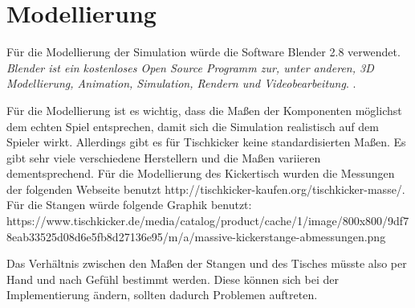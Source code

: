 \section{Modellierung}

Für die Modellierung der Simulation würde die Software Blender 2.8 verwendet. \textit{Blender ist ein kostenloses Open Source Programm zur, unter anderen, 3D Modellierung, Animation, Simulation, Rendern und Videobearbeitung}. \citep{Blender}.\\


Für die Modellierung ist es wichtig, dass die Maßen der Komponenten möglichst dem echten Spiel entsprechen, damit sich die Simulation realistisch auf dem Spieler wirkt. Allerdings gibt es für Tischkicker keine standardisierten Maßen. Es gibt sehr viele verschiedene Herstellern und die Maßen variieren dementsprechend. Für die Modellierung des Kickertisch wurden die Messungen der folgenden Webseite benutzt http://tischkicker-kaufen.org/tischkicker-masse/. Für die Stangen würde folgende Graphik benutzt: https://www.tischkicker.de/media/catalog/product/cache/1/image/800x800/9df78eab33525d08d6e5fb8d27136e95/m/a/massive-kickerstange-abmessungen.png\\


Das Verhältnis zwischen den Maßen der Stangen und des Tisches müsste also per Hand und nach Gefühl bestimmt werden. Diese können sich bei der Implementierung ändern, sollten dadurch Problemen auftreten.